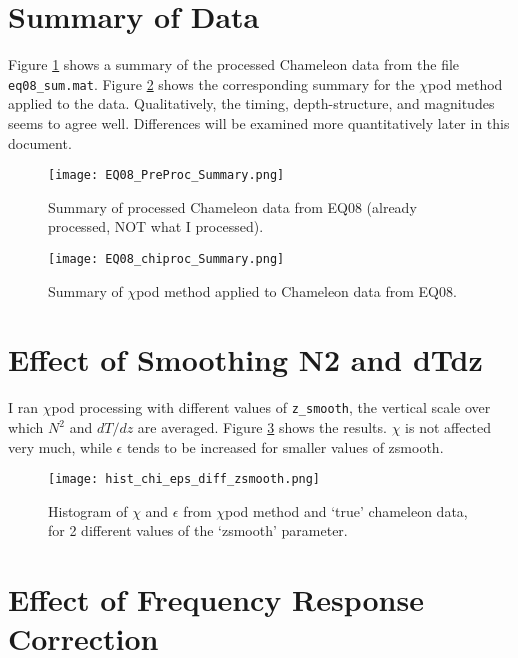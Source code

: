 \documentclass[11pt]{article}
\begin{document}
\section{Summary of Data}

Figure \ref{cham_sum} shows a summary of the processed Chameleon data from the file \verb+eq08_sum.mat+. Figure \ref{chi_sum} shows the corresponding summary for the $\chi$pod method applied to the data. Qualitatively, the timing, depth-structure, and magnitudes seems to agree well. Differences will be examined more quantitatively later in this document.

\begin{figure}[htbp]
\texttt{[image: EQ08\_PreProc\_Summary.png]}
\caption{Summary of processed Chameleon data from EQ08 (already processed, NOT what I processed).}
\label{cham_sum}
\end{figure}

\begin{figure}[htbp]
\texttt{[image: EQ08\_chiproc\_Summary.png]}
\caption{Summary of $\chi$pod method applied to Chameleon data from EQ08.}
\label{chi_sum}
\end{figure}


\clearpage
\newpage
\section{Effect of Smoothing N2 and dTdz}

I ran $\chi$pod processing with different values of \verb+z_smooth+, the vertical scale over which $N^2$ and $dT/dz$ are averaged. Figure \ref{hist_dzsm} shows the results. $\chi$ is not affected very much, while $\epsilon$ tends to be increased for smaller values of zsmooth.


\begin{figure}[htbp]
\texttt{[image: hist\_chi\_eps\_diff\_zsmooth.png]}
\caption{Histogram of $\chi$ and $\epsilon$ from $\chi$pod method and `true' chameleon data, for 2 different values of the `zsmooth' parameter.}
\label{hist_dzsm}
\end{figure}






\clearpage
\newpage
\section{Effect of Frequency Response Correction}
\end{document}
